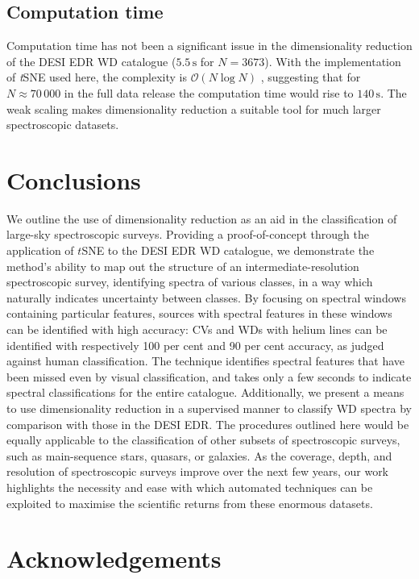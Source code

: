 \documentclass[fleqn,usenatbib]{mnras}
\begin{document}
\subsection{Computation time}

Computation time has not been a significant issue in the dimensionality reduction of the DESI EDR WD catalogue ($5.5\,\text{s}$ for $N=3673$).
With the implementation of \textit{t}SNE used here, the complexity is $\mathcal{O}(N\log N)$ \citep{barneshut, vandermaaten14}, suggesting that for $N\approx 70\,000$ in the full data release the computation time would rise to $140\,\text{s}$.
The weak scaling makes dimensionality reduction a suitable tool for much larger spectroscopic datasets.

\section{Conclusions}
\label{sec:conclusions}

We outline the use of dimensionality reduction as an aid in the classification of large-sky spectroscopic surveys.
Providing a proof-of-concept through the application of $t$SNE to the DESI EDR WD catalogue, we demonstrate the method's ability to map out the structure of an intermediate-resolution spectroscopic survey, identifying spectra of various classes, in a way which naturally indicates uncertainty between classes.
By focusing on spectral windows containing particular features, sources with spectral features in these windows can be identified with high accuracy: CVs and WDs with helium lines can be identified with respectively 100 per cent and 90 per cent accuracy, as judged against human classification.
The technique identifies spectral features that have been missed even by visual classification, and takes only a few seconds to indicate spectral classifications for the entire catalogue.
Additionally, we present a means to use dimensionality reduction in a supervised manner to classify WD spectra by comparison with those in the DESI EDR.
The procedures outlined here would be equally applicable to the classification of other subsets of spectroscopic surveys, such as main-sequence stars, quasars, or galaxies.
As the coverage, depth, and resolution of spectroscopic surveys improve over the next few years, our work highlights the necessity and ease with which automated techniques can be exploited to maximise the scientific returns from these enormous datasets.

\section*{Acknowledgements}
\end{document}
